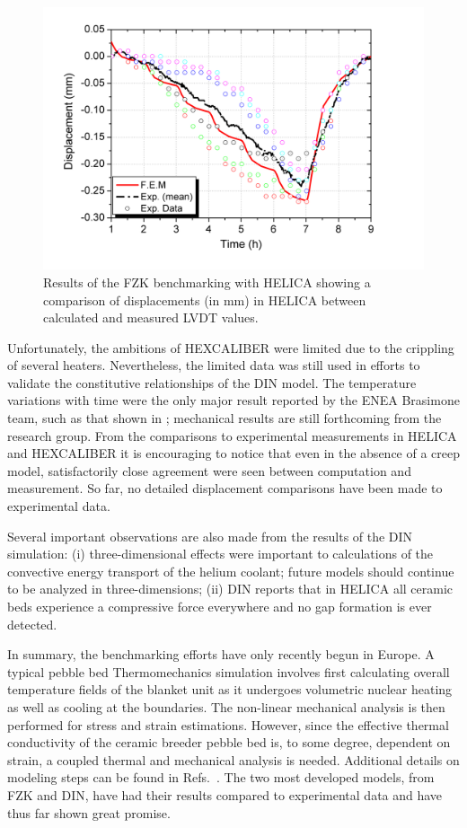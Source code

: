 \begin{figure}[t!]
\centering
\includegraphics[width=\singleimagewidth]{figures/Fig-7}
\caption{Results of the FZK benchmarking with HELICA\cite{Gan:2009vn} showing a comparison of displacements (in mm) in HELICA between calculated and measured LVDT values.}
\label{fig:FZK_HELICAb}
\end{figure}

Unfortunately, the ambitions of HEXCALIBER were limited due to the crippling of several heaters. Nevertheless, the limited data was still used in efforts to validate the constitutive relationships of the DIN model. The temperature variations with time were the only major result reported by the ENEA Brasimone team, such as that shown in ; mechanical results are still forthcoming from the research group. From the comparisons to experimental measurements in HELICA and HEXCALIBER it is encouraging to notice that even in the absence of a creep model, satisfactorily close agreement were seen between computation and measurement. So far, no detailed displacement comparisons have been made to experimental data.

Several important observations are also made from the results of the DIN simulation: (i) three-dimensional effects were important to calculations of the convective energy transport of the helium coolant; future models should continue to be analyzed in three-dimensions; (ii) DIN reports that in HELICA all ceramic beds experience a compressive force everywhere and no gap formation is ever detected. 

In summary, the benchmarking efforts have only recently begun in Europe. A typical pebble bed Thermomechanics simulation involves first calculating overall temperature fields of the blanket unit as it undergoes volumetric nuclear heating as well as cooling at the boundaries. The non-linear mechanical analysis is then performed for stress and strain estimations. However, since the effective thermal conductivity of the ceramic breeder pebble bed is, to some degree, dependent on strain, a coupled thermal and mechanical analysis is needed. Additional details on modeling steps can be found in Refs.~\cite{DellOrco:2010zr,DiMaio20081287,DiMaio20101234,Gan:2009vn,Gan:2010lh,dellorco:2006}. The two most developed models, from FZK and DIN, have had their results compared to experimental data and have thus far shown great promise. 

